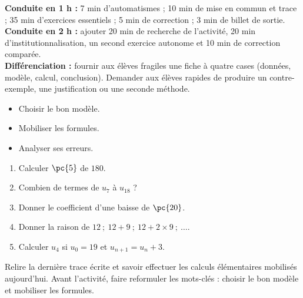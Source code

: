 \ifmxteacher
\begin{method}
\textbf{Conduite en 1 h :} 7 min d'automatismes ; 10 min de mise en commun et trace ; 35 min d'exercices essentiels ; 5 min de correction ; 3 min de billet de sortie.\\
\textbf{Conduite en 2 h :} ajouter 20 min de recherche de l'activité, 20 min d'institutionnalisation, un second exercice autonome et 10 min de correction comparée.\\
\textbf{Différenciation :} fournir aux élèves fragiles une fiche à quatre cases (données, modèle, calcul, conclusion). Demander aux élèves rapides de produire un contre-exemple, une justification ou une seconde méthode.
\end{method}
\fi
{}
\begin{objectives}\begin{itemize}\item Choisir le bon modèle.\item Mobiliser les formules.\item Analyser ses erreurs.\end{itemize}\end{objectives}
\begin{fluency}\begin{enumerate}\item Calculer $\pc{5}$ de $180$. \item Combien de termes de $u_{7}$ à $u_{18}$ ? \item Donner le coefficient d'une baisse de $\pc{20}$. \item Donner la raison de $12\ ;\ 12+9\ ;\ 12+2\times9\ ;\ \ldots$. \item Calculer $u_4$ si $u_0=19$ et $u_{n+1}=u_n+3$. \end{enumerate}\end{fluency}
\begin{prerequisites}Relire la dernière trace écrite et savoir effectuer les calculs élémentaires mobilisés aujourd'hui. Avant l'activité, faire reformuler les mots-clés : choisir le bon modèle et mobiliser les formules.\end{prerequisites}

